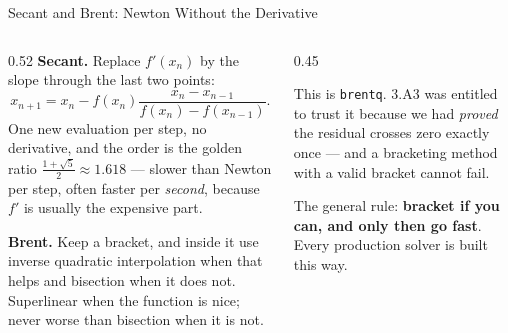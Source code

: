 \begin{frame}{Secant and Brent: Newton Without the Derivative}
\begin{columns}[T]
\begin{column}{0.52\textwidth}
\small
\textbf{Secant.} Replace $f'(x_n)$ by the slope through the last two points:
\[
  x_{n+1}=x_n-f(x_n)\frac{x_n-x_{n-1}}{f(x_n)-f(x_{n-1})} .
\]
One new evaluation per step, no derivative, and the order is the golden ratio
$\tfrac{1+\sqrt5}{2}\approx1.618$ --- slower than Newton per step, often faster per \emph{second}, because $f'$ is usually the expensive part.
\medskip

\textbf{Brent.} Keep a bracket, and inside it use inverse quadratic interpolation when that helps and bisection when it does not. Superlinear when the function is nice; never worse than bisection when it is not.
\end{column}
\begin{column}{0.45\textwidth}
\begin{takeawaybox}[title=\textbf{What was in the box}]\small
This is \texttt{brentq}. 3.A3 was entitled to trust it because we had \emph{proved} the residual crosses zero exactly once --- and a bracketing method with a valid bracket cannot fail.
\end{takeawaybox}
\medskip
\begin{examplebox}\footnotesize
The general rule: \textbf{bracket if you can, and only then go fast}. Every production solver is built this way.
\end{examplebox}
\end{column}
\end{columns}
\end{frame}


